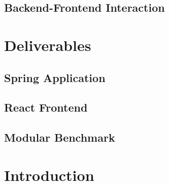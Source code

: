 \section{Backend-Frontend Interaction}

\chapter{Deliverables}

\section{Spring Application}

\section{React Frontend}

\section{Modular Benchmark}

\chapter{Introduction}

